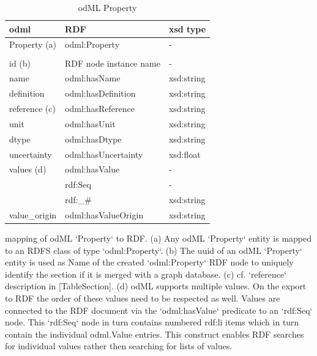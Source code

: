 \documentclass{article}
\begin{document}
\begin{table}
\begin{threeparttable}
\caption{odML Property}
\begin{tabular}{l|l|l}
    odml            & RDF                             & xsd type \\
\hline
    Property (a)    & odml:Property                   & - \\
                    & & \\
    id (b)          & RDF node instance name          & - \\
    name            & odml:hasName                    & xsd:string \\
    definition      & odml:hasDefinition              & xsd:string \\
    reference (c)   & odml:hasReference               & xsd:string \\
    unit            & odml:hasUnit                    & xsd:string \\
    dtype           & odml:hasDtype                   & xsd:string \\
    uncertainty     & odml:hasUncertainty             & xsd:float \\
    values (d)      & odml:hasValue                   & - \\
                    & rdf:Seq                         & - \\
                    & rdf:_#                          & xsd:string \\
    value_origin    & odml:hasValueOrigin             & xsd:string \\
\end{tabular}
\begin{tablenotes}
\item mapping of odML `Property` to RDF. (a) Any odML `Property` entity is mapped to an RDFS class of type `odml:Property`. (b) The uuid of an odML `Property` entity is used as Name of the created `odml:Property` RDF node to uniquely identify the section if it is
merged with a graph database. (c) cf. `reference` description in [TableSection]. (d) odML supports multiple values. On the export to RDF the order of these values need to be respected as well. Values are connected to the RDF document via the `odml:hasValue` predicate to an `rdf:Seq` node. This `rdf:Seq` node in turn contains numbered rdf:li items which in turn contain the individual odml.Value entries. This construct enables RDF searches for individual values rather then searching for lists of values.
\end{tablenotes}
\end{threeparttable}
\end{table}
\end{document}
